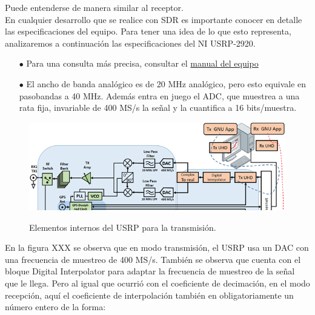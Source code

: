 Puede entenderse de manera similar al receptor. \\


{\setlength{\parindent}{1pt}En cualquier desarrollo que se realice con SDR es importante conocer en detalle las especificaciones del equipo. Para tener una idea de lo que esto representa, analizaremos a continuación las especificaciones del NI USRP-2920.} \\

\begin{itemize}
	\item [$\bullet$] Para una consulta más precisa, consultar el \textcolor{red}{\href{http://www.ni.com/pdf/manuals/376358a.pdf}{manual del equipo}}
	\item [$\bullet$] El ancho de banda analógico es de 20 MHz analógico, pero esto equivale en pasobandas a 40 MHz. Además entra en juego el ADC, que muestrea a una rata fija, invariable de 400 MS/s la señal y la cuantifica a 16 bits/muestra.
\end{itemize}


\begin{figure}[h!]
	\captionsetup{justification = raggedright, singlelinecheck = false}
	\caption{Elementos internos del USRP para la transmisión.} 
	\centering
	\includegraphics[scale=1]{Imagenes/Elementos-internos.png}
	\label{fig:Elementos-internos}
\end{figure}

{\setlength{\parindent}{1pt}En la figura XXX se observa que en modo transmisión, el USRP usa un DAC con una frecuencia de muestreo de 400 MS/s. También se observa que cuenta con el bloque Digital Interpolator para adaptar la frecuencia de muestreo de la señal que le llega.  Pero al igual que ocurrió con el coeficiente de decimación, en el modo recepción, aquí el coeficiente de interpolación también en obligatoriamente un número entero de la forma:}

